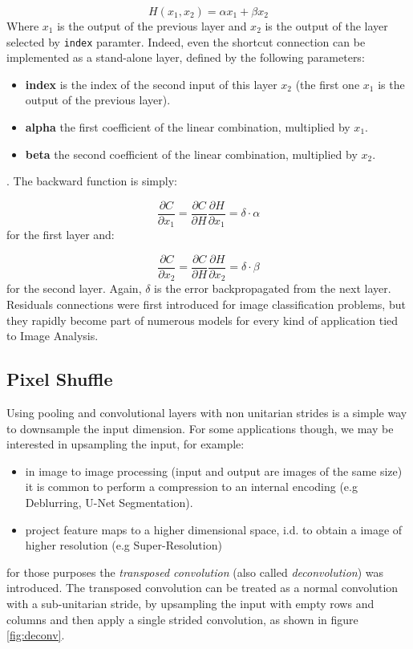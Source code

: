\documentclass[12pt,a4paper]{report}
\begin{document}
\begin{equation}
 H(x_1, x_2) = \alpha x_1 + \beta x_2
\end{equation}
Where $x_1$ is the output of the previous layer and $x_2$ is the output of the layer selected by \texttt{index} paramter. Indeed, even the shortcut connection can be implemented as a stand-alone layer, defined by the following parameters:

\begin{itemize}
 \setlength\itemsep{-0.2em}
 \item {\bf index} is the index of the second input of this layer $x_2$ (the first one $x_1$ is the output of the previous layer).
 \item {\bf alpha} the first coefficient of the linear combination, multiplied by $x_1$.
 \item {\bf beta} the second coefficient of the linear combination, multiplied by $x_2$.
\end{itemize}
.
The backward function is simply:

\begin{equation}
 \frac{\partial C}{\partial x_1} = \frac{\partial C}{\partial H}\frac{\partial H}{\partial x_1} = \delta \cdot \alpha
\end{equation}
for the first layer and:

\begin{equation}
 \frac{\partial C}{\partial x_2} = \frac{\partial C}{\partial H}\frac{\partial H}{\partial x_2} = \delta \cdot \beta
\end{equation}
for the second layer. Again, $\delta$ is the error backpropagated from the next layer. 
Residuals connections were first introduced for image classification problems, but they rapidly become part of numerous models for every kind of application tied to Image Analysis.

\subsection*{Pixel Shuffle}

Using pooling and convolutional layers with non unitarian strides is a simple way to downsample the input dimension. 
For some applications though, we may be interested in upsampling the input, for example: 

\begin{itemize}
 \setlength\itemsep{-0.2em}
 \item in image to image processing (input and output are images of the same size) it is common to perform a compression to an internal encoding (e.g Deblurring, U-Net Segmentation). 
 \item project feature maps to a higher dimensional space, i.d. to obtain a image of higher resolution (e.g Super-Resolution)
\end{itemize}
for those purposes the {\it transposed convolution} (also called {\it deconvolution}) was introduced. 
The transposed convolution can be treated as a normal convolution with a sub-unitarian stride, by upsampling the input with empty rows and columns and then apply a single strided convolution, as shown in figure \ref{fig:deconv}.
\end{document}

